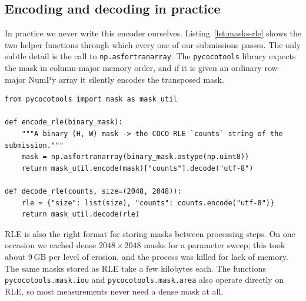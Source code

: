 \subsection{Encoding and decoding in practice}\label{sec:masks-rle-code}
In practice we never write this encoder ourselves. Listing~\ref{lst:masks-rle} shows the two helper
functions through which every one of our submissions passes. The only subtle detail is the call to
\texttt{np.asfortranarray}. The \texttt{pycocotools} library expects the mask in column-major
memory order, and if it is given an ordinary row-major NumPy array it silently encodes the
transposed mask.

\begin{lstlisting}[caption={Encoding and decoding submission masks. From \file{shared/utils.py}.},label=lst:masks-rle]
from pycocotools import mask as mask_util

def encode_rle(binary_mask):
    """A binary (H, W) mask -> the COCO RLE `counts` string of the submission."""
    mask = np.asfortranarray(binary_mask.astype(np.uint8))
    return mask_util.encode(mask)["counts"].decode("utf-8")

def decode_rle(counts, size=(2048, 2048)):
    rle = {"size": list(size), "counts": counts.encode("utf-8")}
    return mask_util.decode(rle)
\end{lstlisting}

RLE is also the right format for storing masks between processing steps. On one occasion we cached
dense $2048\times2048$ masks for a parameter sweep; this took about 9\,GB per level of erosion, and
the process was killed for lack of memory. The same masks stored as RLE take a few kilobytes each.
The functions \texttt{pycocotools.mask.iou} and \texttt{pycocotools.mask.area} also operate
directly on RLE, so most measurements never need a dense mask at all.

